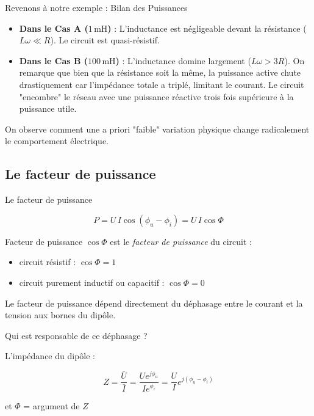\begin{frame}[allowframebreaks]{Revenons à notre exemple : Bilan des Puissances}
	\begin{itemize}
		\item \textbf{Dans le Cas A ($1 \, \text{mH}$)} : L'inductance est négligeable devant la résistance ($L\omega \ll R$). Le circuit est quasi-résistif. 
		\item \textbf{Dans le Cas B ($100 \, \text{mH}$)} : L'inductance domine largement ($L\omega > 3R$). On remarque que bien que la résistance soit la même, la puissance active chute drastiquement car l'impédance totale a triplé, limitant le courant. Le circuit "encombre" le réseau avec une puissance réactive trois fois supérieure à la puissance utile.
	\end{itemize}

	On observe comment une a priori "faible" variation physique change radicalement le comportement électrique.

	\end{frame}

	
	

	\subsection{Le facteur de puissance}
	\begin{frame}[allowframebreaks]{Le facteur de puissance}
	
		\[P=U\,I\cos(\phi_u-\phi_i)=U\,I\cos \Phi\]
		
		\begin{block}{Facteur de puissance}
		$\cos \Phi$ est le {\em facteur de puissance} du circuit :
		\begin{itemize}
			\item circuit résistif : $\cos \Phi=1$
			\item circuit purement inductif ou capacitif : $\cos \Phi=0$
		\end{itemize}
		\end{block}		
		
		
		Le facteur de puissance dépend directement du déphasage entre le
		courant et la tension aux bornes du dipôle.
		
		Qui est responsable de ce déphasage ? 
		
		L'impédance du dipôle : 
		
		\[Z=\frac{\bar{U}}{\bar{I}}=\frac{Ue^{j\phi_u}}{Ie^{\phi_i}}=\frac{U}{I}e^{j(\phi_u-\phi_i)}\]
		
		et $\Phi$ = argument de $Z$
	\end{frame}
	
